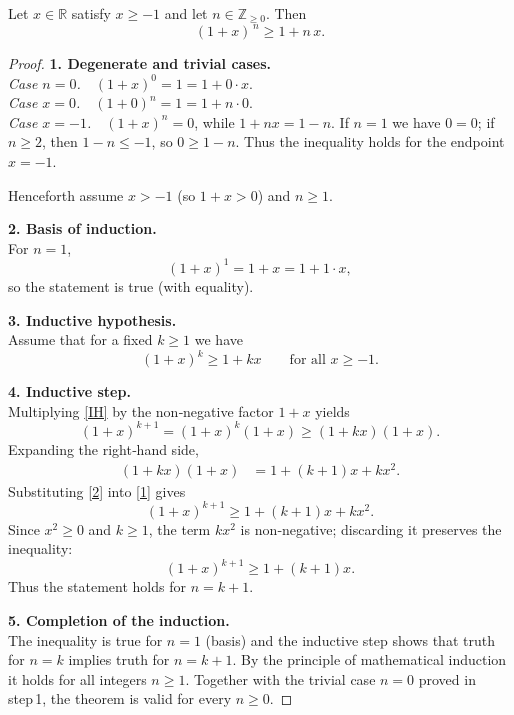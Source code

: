 \begin{theorem}
Let $x\in\mathbb R$ satisfy $x\ge -1$ and let $n\in\mathbb Z_{\ge0}$. Then
\[
(1+x)^{\,n}\ge 1+n\,x .
\]
\end{theorem}

\begin{proof}
\textbf{1. Degenerate and trivial cases.}\\
\emph{Case $n=0$.} $(1+x)^{0}=1=1+0\cdot x$.\\
\emph{Case $x=0$.} $(1+0)^{n}=1=1+n\cdot0$.\\
\emph{Case $x=-1$.} $(1+x)^{n}=0$, while $1+n x = 1-n$.  
If $n=1$ we have $0=0$; if $n\ge2$, then $1-n\le -1$, so $0\ge 1-n$.  
Thus the inequality holds for the endpoint $x=-1$.

Henceforth assume $x>-1$ (so $1+x>0$) and $n\ge1$.

\medskip\noindent\textbf{2. Basis of induction.}\\
For $n=1$,
\[
(1+x)^{1}=1+x=1+1\cdot x ,
\]
so the statement is true (with equality).

\medskip\noindent\textbf{3. Inductive hypothesis.}\\
Assume that for a fixed $k\ge1$ we have
\begin{equation}
(1+x)^{k}\ge 1+kx \qquad\text{for all }x\ge-1 .
\tag{IH}
\end{equation}

\medskip\noindent\textbf{4. Inductive step.}\\
Multiplying \eqref{IH} by the non‑negative factor $1+x$ yields
\begin{equation}
(1+x)^{k+1}=(1+x)^{k}(1+x)\ge (1+kx)(1+x) .
\tag{1}
\end{equation}
Expanding the right‑hand side,
\begin{align}
(1+kx)(1+x) &= 1 + (k+1)x + kx^{2} .
\tag{2}
\end{align}
Substituting \eqref{2} into \eqref{1} gives
\begin{equation}
(1+x)^{k+1}\ge 1+(k+1)x+kx^{2} .
\tag{3}
\end{equation}
Since $x^{2}\ge0$ and $k\ge1$, the term $k x^{2}$ is non‑negative; discarding it preserves the inequality:
\[
(1+x)^{k+1}\ge 1+(k+1)x .
\]
Thus the statement holds for $n=k+1$.

\medskip\noindent\textbf{5. Completion of the induction.}\\
The inequality is true for $n=1$ (basis) and the inductive step shows that truth for $n=k$ implies truth for $n=k+1$. By the principle of mathematical induction it holds for all integers $n\ge1$. Together with the trivial case $n=0$ proved in step 1, the theorem is valid for every $n\ge0$.


\end{proof}
